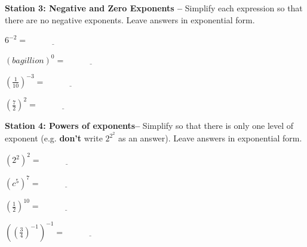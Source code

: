 \documentclass[12pt]{article}
\begin{document}
\hrulefill

\textbf{Station 3: Negative and Zero Exponents --} Simplify each expression so that there are no negative exponents. Leave answers in exponential form.

\begin{enumerate}[resume]
\begin{multicols}{2}

	\item $6^{-2}=\underline{\hspace{1in}}$\\

	\item $(bagillion)^0=\underline{\hspace{1in}}$\\
	
	\item $\left(\frac{1}{10}\right)^{-3}=\underline{\hspace{1in}}$\\
	
	\item $\left(\frac{7}{2}\right)^{2}=\underline{\hspace{1in}}$\\
	
	
\end{multicols}
\end{enumerate}

\hrulefill

\textbf{Station 4: Powers of exponents--} Simplify so that there is only one level of exponent (e.g. \textbf{don't} write $2^{2^2}$ as an answer). Leave answers in exponential form.

\begin{enumerate}[resume]
\begin{multicols}{2}

	\item $\left(2^2\right)^2=\underline{\hspace{1in}}$\\
	
	\item $\left(c^5\right)^7=\underline{\hspace{1in}}$\\
	
	\item $\left(\frac{1}{2}\right)^{10}=\underline{\hspace{1in}}$\\
	
	\item $\left(\left(\frac{3}{4}\right)^{-1}\right)^{-1}=\underline{\hspace{1in}}$\\

\end{multicols}
\end{enumerate}
\end{document}
